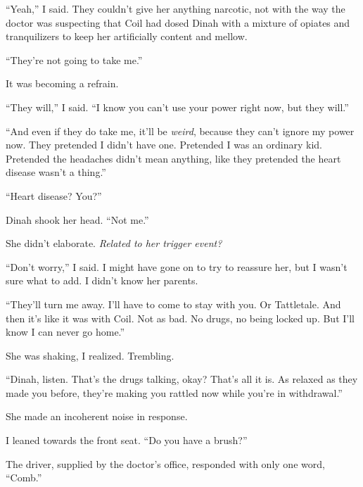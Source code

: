 ``Yeah,'' I said.  They couldn't give her anything narcotic, not with the way the doctor was suspecting that Coil had dosed Dinah with a mixture of opiates and tranquilizers to keep her artificially content and mellow.



``They're not going to take me.''



It was becoming a refrain.



``They will,'' I said.  ``I know you can't use your power right now, but they will.''



``And even if they do take me, it'll be \emph{weird}, because they can't ignore my power now.  They pretended I didn't have one.  Pretended I was an ordinary kid.  Pretended the headaches didn't mean anything, like they pretended the heart disease wasn't a thing.''



``Heart disease?  You?''



Dinah shook her head.  ``Not me.''



She didn't elaborate.  \emph{Related to her trigger event?}



``Don't worry,'' I said.  I might have gone on to try to reassure her, but I wasn't sure what to add.  I didn't know her parents.



``They'll turn me away.  I'll have to come to stay with you.  Or Tattletale.  And then it's like it was with Coil.  Not as bad.  No drugs, no being locked up.  But I'll know I can never go home.''



She was shaking, I realized.  Trembling.



``Dinah, listen.  That's the drugs talking, okay?  That's all it is.  As relaxed as they made you before, they're making you rattled now while you're in withdrawal.''



She made an incoherent noise in response.



I leaned towards the front seat.  ``Do you have a brush?''



The driver, supplied by the doctor's office, responded with only one word, ``Comb.''



